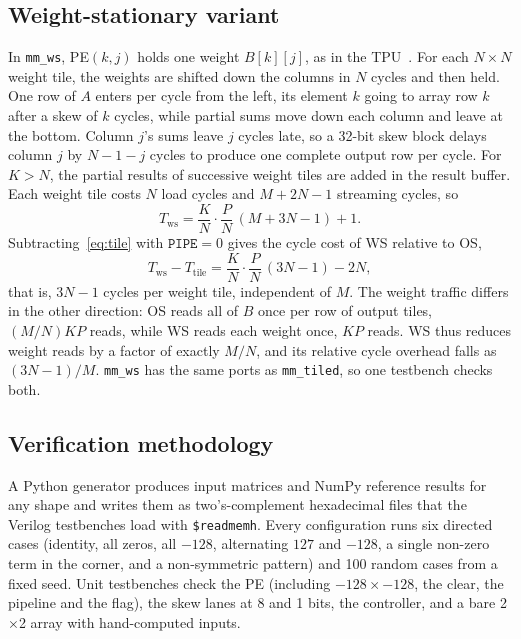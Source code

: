\documentclass[conference]{IEEEtran}
\newcommand{\code}[1]{\texttt{#1}}
\begin{document}
\subsection{Weight-stationary variant}
\label{sec:ws}
In \code{mm\_ws}, PE$(k,j)$ holds one weight $B[k][j]$, as in the TPU~\cite{jouppi2017}. For each $N\times N$ weight tile, the weights are shifted down the columns in $N$ cycles and then held. One row of $A$ enters per cycle from the left, its element $k$ going to array row $k$ after a skew of $k$ cycles, while partial sums move down each column and leave at the bottom. Column $j$'s sums leave $j$ cycles late, so a 32-bit skew block delays column $j$ by $N{-}1{-}j$ cycles to produce one complete output row per cycle. For $K > N$, the partial results of successive weight tiles are added in the result buffer. Each weight tile costs $N$ load cycles and $M + 2N - 1$ streaming cycles, so
\begin{equation}
T_{\text{ws}} = \frac{K}{N}\cdot\frac{P}{N}\,(M + 3N - 1) + 1.
\label{eq:tws}
\end{equation}
Subtracting~\eqref{eq:tile} with $\mathtt{PIPE}=0$ gives the cycle cost of WS relative to OS,
\begin{equation}
T_{\text{ws}} - T_{\text{tile}} = \frac{K}{N}\cdot\frac{P}{N}\,(3N - 1) - 2N,
\label{eq:delta}
\end{equation}
that is, $3N{-}1$ cycles per weight tile, independent of $M$. The weight traffic differs in the other direction: OS reads all of $B$ once per row of output tiles, $(M/N)KP$ reads, while WS reads each weight once, $KP$ reads. WS thus reduces weight reads by a factor of exactly $M/N$, and its relative cycle overhead falls as $(3N{-}1)/M$. \code{mm\_ws} has the same ports as \code{mm\_tiled}, so one testbench checks both.

\subsection{Verification methodology}
\label{sec:verif}
A Python generator produces input matrices and NumPy reference results for any shape and writes them as two's-complement hexadecimal files that the Verilog testbenches load with \code{\$readmemh}. Every configuration runs six directed cases (identity, all zeros, all $-128$, alternating $127$ and $-128$, a single non-zero term in the corner, and a non-symmetric pattern) and 100 random cases from a fixed seed. Unit testbenches check the PE (including $-128 \times -128$, the clear, the pipeline and the flag), the skew lanes at 8 and 1 bits, the controller, and a bare 2$\times$2 array with hand-computed inputs.
\end{document}
